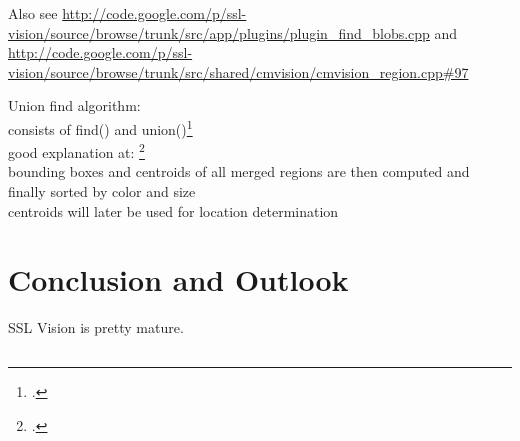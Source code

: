 Also see
\url{http://code.google.com/p/ssl-vision/source/browse/trunk/src/app/plugins/plugin_find_blobs.cpp}
and 
\url{http://code.google.com/p/ssl-vision/source/browse/trunk/src/shared/cmvision/cmvision_region.cpp#97}

Union find algorithm:\\
consists of find() and union()\footcite[Cf.][]{sedgewick_union_find}\\
good explanation at:
\footcite[Cf.][]{wa_union_find} \\

bounding boxes and centroids of all merged regions are then computed and finally
sorted by color and size\\

centroids will later be used for location determination






\clearpage
\section{Conclusion and Outlook}
\label{sec:conclusion}
SSL Vision is pretty mature.




\newpage \begin{appendices} 
\appendixtocon %

\appendixpage %

\subsection*{\listappendixname}
\listofappendices

\newpage

\begin{subappendices}
\renewcommand{\setthesubsection}{\arabic{subsection}:}%

\label{apx:code-template}


\end{subappendices}
\end{appendices}
